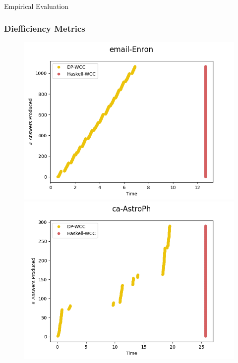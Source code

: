 \documentclass{beamer}
\begin{document}
  \begin{frame}[fragile]{Empirical Evaluation}
    \frametitle{Diefficiency Metrics}
      \begin{figure}[!htb]
        \centering
        \begin{minipage}{0.33\textwidth}
         \includegraphics[width=1\linewidth, height=0.4\textheight]{email_enron}
        \end{minipage}%
        \begin{minipage}{0.33\textwidth}
         \includegraphics[width=1\linewidth, height=0.4\textheight]{ca_astroph}
        \end{minipage}%
        \begin{minipage}{0.33\textwidth}

\end{minipage}
\end{figure}
\end{frame}
\end{document}
